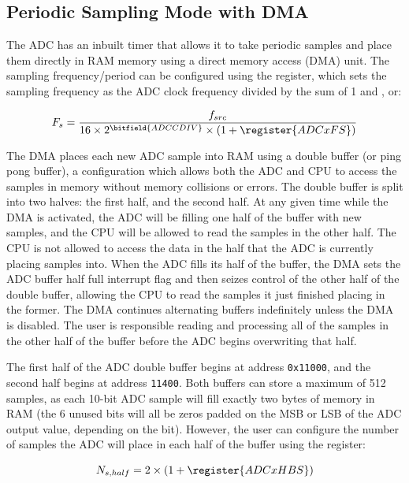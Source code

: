 \subsection{Periodic Sampling Mode with DMA}

The ADC has an inbuilt timer that allows it to take periodic samples and place them directly in RAM memory using a direct memory access (DMA) unit. The sampling frequency/period can be configured using the  register, which sets the sampling frequency as the ADC clock frequency divided by the sum of 1 and , or:

\begin{equation*}
	F_{s} = \frac{f_{src}}{16 \times 2^\bitfield{ADCCDIV} \times (1 + \register{ADCxFS})}
\end{equation*}

The DMA places each new ADC sample into RAM using a double buffer (or ping pong buffer), a configuration which allows both the ADC and CPU to access the samples in memory without memory collisions or errors. The double buffer is split into two halves: the first half, and the second half. At any given time while the DMA is activated, the ADC will be filling one half of the buffer with new samples, and the CPU will be allowed to read the samples in the other half. The CPU is not allowed to access the data in the half that the ADC is currently placing samples into. When the ADC fills its half of the buffer, the DMA sets the ADC buffer half full interrupt flag  and then seizes control of the other half of the double buffer, allowing the CPU to read the samples it just finished placing in the former. The DMA continues alternating buffers indefinitely unless the DMA is disabled. The user is responsible reading and processing all of the samples in the other half of the buffer before the ADC begins overwriting that half.

The first half of the ADC double buffer begins at address \texttt{0x11000}, and the second half begins at address \texttt{11400}. Both buffers can store a maximum of 512 samples, as each 10-bit ADC sample will fill exactly two bytes of memory in RAM (the 6 unused bits will all be zeros padded on the MSB or LSB of the ADC output value, depending on the  bit). However, the user can configure the number of samples the ADC will place in each half of the buffer using the  register:

\begin{equation*}
	N_{s,half} = 2 \times (1 + \register{ADCxHBS})
\end{equation*}

